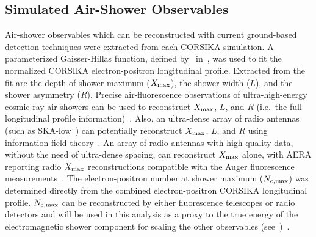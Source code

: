 \subsection{Simulated Air-Shower Observables}\label{ssec:observables}
Air-shower observables which can be reconstructed with current ground-based detection techniques were extracted from each CORSIKA simulation.
A parameterized Gaisser-Hillas function, defined by~ in~, was used to fit the normalized CORSIKA electron-positron longitudinal profile.
Extracted from the fit are the depth of shower maximum ($X_{\rm max}$), the shower width ($L$), and the shower asymmetry ($R$).
Precise air-fluorescence observations of ultra-high-energy cosmic-ray air showers can be used to reconstruct $X_{\rm max}$, $L$, and $R$ (i.e.~the full longitudinal profile information)~\cite{auger_jcap2019_longitudinalprofiles, icrc2023_bellido_longitudinalprofiles}. Also, an ultra-dense array of radio antennas (such as SKA-low~\cite{SKA_designreport}) can potentially reconstruct $X_{\rm max}$, $L$, and $R$ using information field theory~\cite{icrc2023_corstanje_ska, arena2024_buitink_ska, icrc2025_watanabe}.
An array of radio antennas with high-quality data, without the need of ultra-dense spacing, can reconstruct $X_{\rm max}$ alone, with AERA reporting radio $X_{\rm max}$ reconstructions compatible with the Auger fluorescence measurements~\cite{auger_prd2024_aeraxmax, auger_prl2024_aeraxmax}.
The electron-positron number at shower maximum ($N_{\rm e, max}$) was determined directly from the combined electron-positron CORSIKA longitudinal profile.
$N_{\rm e, max}$ can be reconstructed by either fluorescence telescopes or radio detectors and will be used in this analysis as a proxy to the true energy of the electromagnetic shower component for scaling the other observables (see~)~\cite{schroeder_ppnp2017_radio, huege_physrep2016_radio}.

